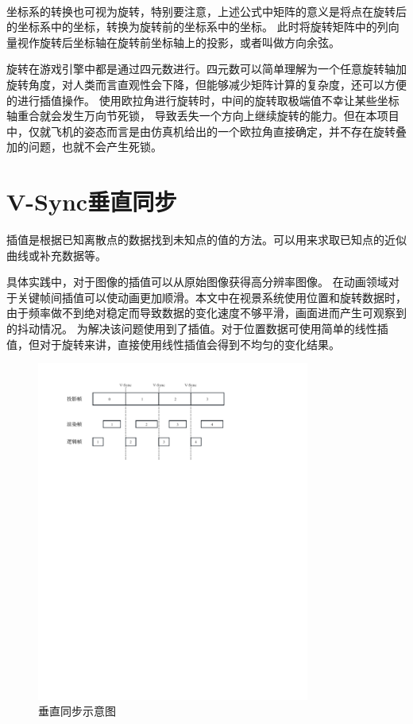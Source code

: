 ~\\
\par
坐标系的转换也可视为旋转，特别要注意，上述公式中矩阵的意义是将点在旋转后的坐标系中的坐标，转换为旋转前的坐标系中的坐标。
此时将旋转矩阵中的列向量视作旋转后坐标轴在旋转前坐标轴上的投影，或者叫做方向余弦。

\par 
旋转在游戏引擎中都是通过四元数进行。四元数可以简单理解为一个任意旋转轴加旋转角度，对人类而言直观性会下降，但能够减少矩阵计算的复杂度，还可以方便的进行插值操作\cite{rotate2}。
使用欧拉角进行旋转时，中间的旋转取极端值不幸让某些坐标轴重合就会发生万向节死锁，
导致丢失一个方向上继续旋转的能力\cite{rotate3}。但在本项目中，仅就飞机的姿态而言是由仿真机给出的一个欧拉角直接确定，并不存在旋转叠加的问题，也就不会产生死锁。
\section{V-Sync垂直同步}
插值是根据已知离散点的数据找到未知点的值的方法。可以用来求取已知点的近似曲线或补充数据等。

具体实践中，对于图像的插值可以从原始图像获得高分辨率图像\cite{lerp2}。
在动画领域对于关键帧间插值可以使动画更加顺滑。本文中在视景系统使用位置和旋转数据时，由于频率做不到绝对稳定而导致数据的变化速度不够平滑，画面进而产生可观察到的抖动情况。
为解决该问题使用到了插值。对于位置数据可使用简单的线性插值，但对于旋转来讲，直接使用线性插值会得到不均匀的变化结果。
\begin{figure}[h!]
    \begin{center}
        \includegraphics[width=0.8\textwidth]{pictures/vsync.pdf}
        \caption{垂直同步示意图}
        \label{vsync}
    \end{center}
\end{figure}
